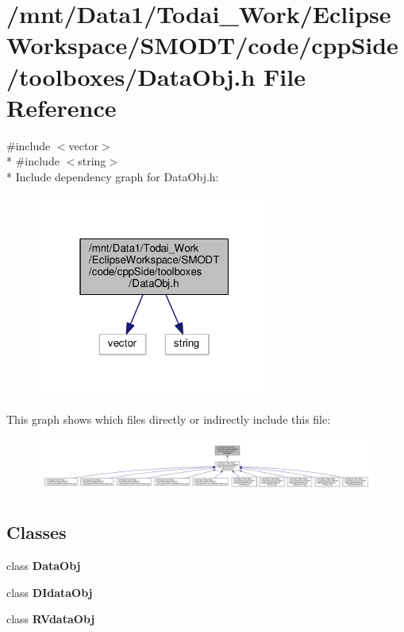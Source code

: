 \section{/mnt/\-Data1/\-Todai\-\_\-\-Work/\-Eclipse\-Workspace/\-S\-M\-O\-D\-T/code/cpp\-Side/toolboxes/\-Data\-Obj.h File Reference}
\label{_data_obj_8h}
{\ttfamily \#include $<$vector$>$}\\*
{\ttfamily \#include $<$string$>$}\\*
Include dependency graph for Data\-Obj.\-h\-:
\nopagebreak
\begin{figure}[H]
\begin{center}
\leavevmode
\includegraphics[width=220pt]{_data_obj_8h__incl}
\end{center}
\end{figure}
This graph shows which files directly or indirectly include this file\-:
\nopagebreak
\begin{figure}[H]
\begin{center}
\leavevmode
\includegraphics[width=350pt]{_data_obj_8h__dep__incl}
\end{center}
\end{figure}
\subsection*{Classes}
\begin{DoxyCompactItemize}
\item 
class {\bf Data\-Obj}
\item 
class {\bf D\-Idata\-Obj}
\item 
class {\bf R\-Vdata\-Obj}
\end{DoxyCompactItemize}
